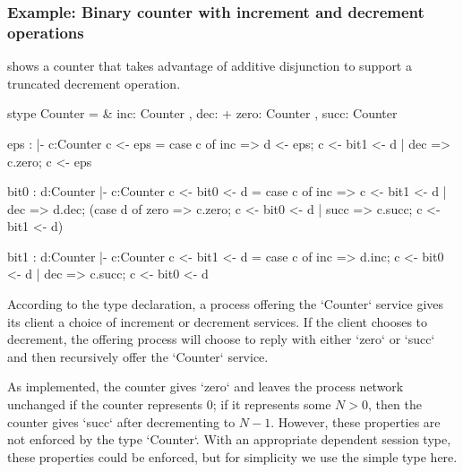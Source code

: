\subsubsection{Example: Binary counter with increment and decrement operations}\label{sec:exampl-binary-count-1}

 shows a counter that takes advantage of additive disjunction to support a truncated decrement operation.
%
\begin{sillcode}[
  caption={A binary counter supporting increments and decrements},
  label={lst:counter-inc-dec},
  floatplacement=tb,
  gobble=2
]
  stype Counter = &{ inc: Counter ,
                     dec: +{ zero: Counter , succ: Counter } }
  
  eps : {|- c:Counter}
  c <- eps =
  { case c of
      inc => d <- eps;
             c <- bit1 <- d
    | dec => c.zero;
             c <- eps }
  
  bit0 : {d:Counter |- c:Counter}
  c <- bit0 <- d =
  { case c of
      inc => c <- bit1 <- d
    | dec => d.dec;
             (case d of
                zero => c.zero;
                        c <- bit0 <- d
              | succ => c.succ;
                        c <- bit1 <- d) }
  
  bit1 : {d:Counter |- c:Counter}
  c <- bit1 <- d =
  { case c of
      inc => d.inc;
             c <- bit0 <- d
    | dec => c.succ;
             c <- bit0 <- d }
\end{sillcode}%
%
According to the type declaration, a process offering the \msill`Counter` service gives its client a choice of increment or decrement services.
If the client chooses to decrement, the offering process will choose to reply with either \msill`zero` or \msill`succ` and then recursively offer the \msill`Counter` service.

As implemented, the counter gives \msill`zero` and leaves the process network unchanged if the counter represents $0$;
if it represents some $N > 0$, then the counter gives \msill`succ` after decrementing to $N - 1$.
However, these properties are not enforced by the type \msill`Counter`.
With an appropriate dependent session type, these properties could be enforced, but for simplicity we use the simple type here.

